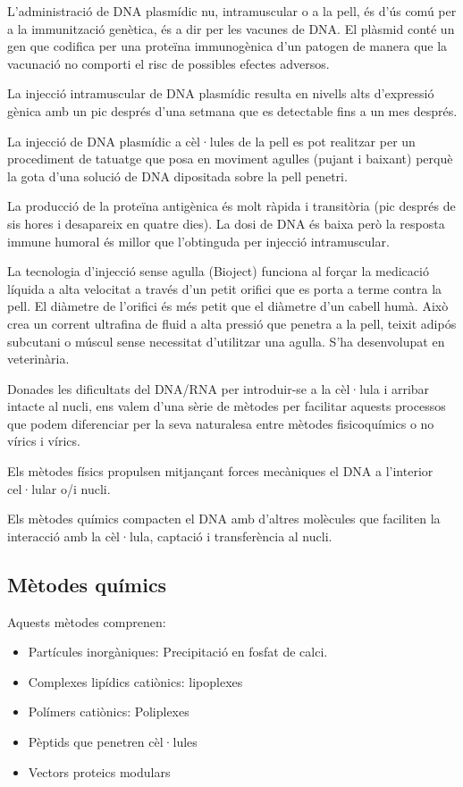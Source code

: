 L'administració de DNA plasmídic nu, intramuscular o a la pell, és d'ús comú per a la immunització genètica, és a dir per les vacunes de DNA. El plàsmid conté un gen que codifica per una proteïna immunogènica d'un patogen de manera que la vacunació no comporti el risc de possibles efectes adversos.

La injecció intramuscular de DNA plasmídic resulta en nivells alts d'expressió gènica amb un pic després d'una setmana que es detectable fins a un mes després.

La injecció de DNA plasmídic a cèl·lules de la pell es pot realitzar per un procediment de tatuatge que posa en moviment agulles (pujant i baixant) perquè la gota d'una solució de DNA dipositada sobre la pell penetri.

La producció de la proteïna antigènica és molt ràpida i transitòria (pic després de sis hores i desapareix en quatre dies). La dosi de DNA és baixa però la resposta immune humoral és millor que l'obtinguda per injecció intramuscular.

La tecnologia d'injecció sense agulla (Bioject) funciona al forçar la medicació líquida a alta velocitat a través d'un petit orifici que es porta a terme contra la pell. El diàmetre de l'orifici és més petit que el diàmetre d'un cabell humà. Això crea un corrent ultrafina de fluid a alta pressió que penetra a la pell, teixit adipós subcutani o múscul sense necessitat d'utilitzar una agulla. S'ha desenvolupat en veterinària.

Donades les dificultats del DNA/RNA per introduir-se a la cèl·lula i arribar intacte al nucli, ens valem d'una sèrie de mètodes per facilitar aquests processos que podem diferenciar per la seva naturalesa entre mètodes fisicoquímics o no vírics i vírics.

Els mètodes físics propulsen mitjançant forces mecàniques el DNA a l'interior cel·lular o/i nucli.

Els mètodes químics compacten el DNA amb d'altres molècules que faciliten la interacció amb la cèl·lula, captació i transferència al nucli.

\subsection{Mètodes químics}
\label{sec:metodes-quimics}
Aquests mètodes comprenen:
\begin{itemize}
\item Partícules inorgàniques: Precipitació en fosfat de calci.
\item Complexes lipídics catiònics: lipoplexes
\item Polímers catiònics: Poliplexes
\item Pèptids que penetren cèl·lules
\item Vectors proteics modulars
\end{itemize}

